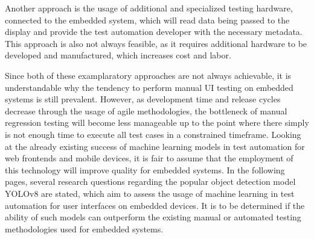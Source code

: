 \documentclass[Proposal,BIC,english,fhCitStyle,IEEE]{BASE/twbook} %
\begin{document}
Another approach \cite[]{approachB} is the usage of additional and specialized testing hardware, connected to the embedded system, which will read data being passed to the display and provide the test automation developer with the necessary metadata. This approach is also not always feasible, as it requires additional hardware to be developed and manufactured, which increases cost and labor.

Since both of these examplaratory approaches are not always achievable, it is understandable why the tendency to perform manual UI testing on embedded systems is still prevalent.
However, as development time and release cycles decrease through the usage of agile methodologies, the bottleneck of manual regression testing will become less manageable up to the point where there simply is not enough time to execute all test cases in a constrained timeframe.
Looking at the already existing success of machine learning models in test automation for web frontends and mobile devices, it is fair to assume that the employment of this technology will improve quality for embedded systems. In the following pages, several research questions regarding the popular object detection model YOLOv8 are stated, which aim to assess the usage of machine learning in test automation for user interfaces on embedded devices. It is to be determined if the ability of such models can outperform the existing manual or automated testing methodologies used for embedded systems.
\end{document}
